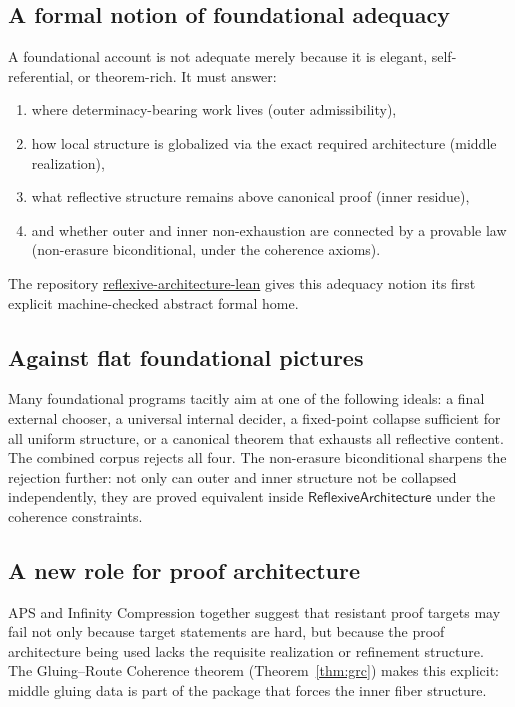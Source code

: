 \documentclass[11pt]{article}
\newcommand{\RAL}{\ensuremath{\mathsf{ReflexiveArchitecture}}}
\begin{document}
\subsection{A formal notion of foundational adequacy}

A foundational account is not adequate merely because it is elegant, self-referential,
or theorem-rich.  It must answer:
\begin{enumerate}[leftmargin=2em]
\item where determinacy-bearing work lives (outer admissibility),
\item how local structure is globalized via the exact required architecture (middle
realization),
\item what reflective structure remains above canonical proof (inner residue),
\item and whether outer and inner non-exhaustion are connected by a provable law (non-erasure
biconditional, under the coherence axioms).
\end{enumerate}
The repository \url{reflexive-architecture-lean} gives this adequacy notion its first
explicit machine-checked abstract formal home.

\subsection{Against flat foundational pictures}

Many foundational programs tacitly aim at one of the following ideals: a final external
chooser, a universal internal decider, a fixed-point collapse sufficient for all uniform
structure, or a canonical theorem that exhausts all reflective content.  The combined
corpus rejects all four.  The non-erasure biconditional sharpens the rejection further:
not only can outer and inner structure not be collapsed independently, they are proved
equivalent inside $\RAL$ under the coherence constraints.

\subsection{A new role for proof architecture}

APS and Infinity Compression together suggest that resistant proof targets may fail not
only because target statements are hard, but because the proof architecture being used
lacks the requisite realization or refinement structure.  The Gluing--Route Coherence
theorem (Theorem~\ref{thm:grc}) makes this explicit: middle gluing data is part of the
package that forces the inner fiber structure.
\end{document}
